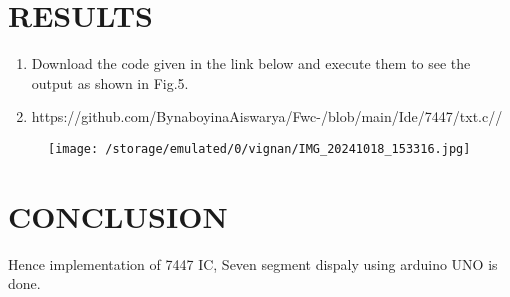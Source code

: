 \documentclass[conference]{IEEEtran}
\begin{document}
\section{RESULTS}
 \begin{enumerate}
	 \item Download the code given in the link below and execute them to see the output as shown in Fig.5. 
	 \item https://github.com/BynaboyinaAiswarya/Fwc-/blob/main/Ide/7447/txt.c//
 \end{enumerate}
		 \begin{figure}[h] 
	\centering 
	\texttt{[image:   /storage/emulated/0/vignan/IMG\_20241018\_153316.jpg]}
	\caption{\label{fig:Gates}}    
\end{figure}
\section{CONCLUSION}
Hence implementation of 7447 IC, Seven segment dispaly using arduino UNO is done.
\end{document}
